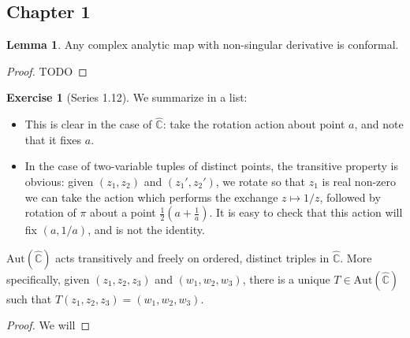 \documentclass[aps,pra,showpacs,notitlepage,onecolumn,superscriptaddress,nofootinbib]{revtex4-1}
\theoremstyle{definition}
\newtheorem{lemma}{Lemma}[section]
\newtheorem{exercise}{Exercise}[section]
\begin{document}
\subsection{Chapter 1}

\begin{lemma}
  Any complex analytic map with non-singular derivative is conformal.
\end{lemma}
\begin{proof}
  TODO
\end{proof}

\begin{exercise}[Series 1.12]
  We summarize in a list:
  \begin{itemize}
  \item This is clear in the case of $\hat{\mathbb{C}}$: take the rotation action about point $a$, and note that it fixes $a$.
  \item In the case of two-variable tuples of distinct points, the transitive property is obvious: given $(z_1, z_2)$ and $(z_1', z_2')$, we rotate so that $z_1$ is real non-zero 
    we can
  take the action which performs the exchange $z \mapsto 1/z$, followed by rotation of $\pi$ about a point $\frac{1}{2} \left(a + \frac{1}{a} \right)$. It is easy to check that this action will
  fix $(a, 1/a)$, and is not the identity.
  \end{itemize}
\end{exercise}

\begin{proposition}[Series 1.13]
  $\text{Aut}(\hat{\mathbb{C}})$ acts transitively and freely on ordered, distinct triples in $\hat{\mathbb{C}}$. More specifically, given $(z_1, z_2, z_3)$ and $(w_1, w_2, w_3)$, there is a unique $T \in \text{Aut}(\hat{\mathbb{C}})$ such
  that $T(z_1, z_2, z_3) = (w_1, w_2, w_3)$.
\end{proposition}
\begin{proof}
  We will 
  \end{proof}
\end{document}
